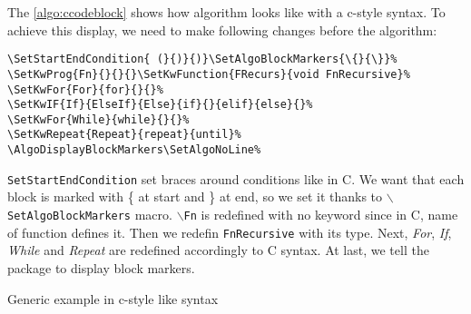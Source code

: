 \documentclass[a4paper]{article}
\begin{document}
 The \autoref{algo:ccodeblock} shows how algorithm looks like with a c-style
syntax. To achieve this display, we need to make following changes before the algorithm:\vspace{-1.5ex}
\begin{verbatim}
\SetStartEndCondition{ (}{)}{)}\SetAlgoBlockMarkers{\{}{\}}%
\SetKwProg{Fn}{}{}{}\SetKwFunction{FRecurs}{void FnRecursive}%
\SetKwFor{For}{for}{}{}%
\SetKwIF{If}{ElseIf}{Else}{if}{}{elif}{else}{}%
\SetKwFor{While}{while}{}{}%
\SetKwRepeat{Repeat}{repeat}{until}%
\AlgoDisplayBlockMarkers\SetAlgoNoLine%
\end{verbatim}
\vspace{-1.5ex} \texttt{SetStartEndCondition} set braces around conditions like in C. We
want that each block is marked with \{ at start and \} at end, so we set it thanks to
\texttt{$\backslash$SetAlgoBlockMarkers} macro. \texttt{$\backslash$Fn} is redefined with
no keyword since in C, name of function defines it. Then we redefin \texttt{FnRecursive}
with its type. Next, \emph{For}, \emph{If}, \emph{While} and \emph{Repeat} are redefined
accordingly to C syntax. At last, we tell the package to display block markers.
%
\begin{algorithm}\AlgoDisplayBlockMarkers\SetAlgoNoLine%
\SetStartEndCondition{ (}{)}{)}\SetAlgoBlockMarkers{\{}{\}}%
%
%
%
%
%
  \caption{Generic example in c-style like syntax}\label{algo:ccodeblock}
  
\end{algorithm}
\end{document}
